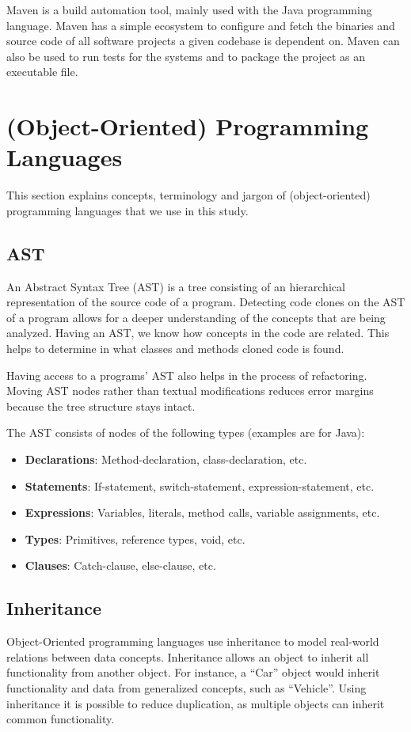 Maven is a build automation tool, mainly used with the Java programming language. Maven has a simple ecosystem to configure and fetch the binaries and source code of all software projects a given codebase is dependent on. Maven can also be used to run tests for the systems and to package the project as an executable file.

\section{(Object-Oriented) Programming Languages}
This section explains concepts, terminology and jargon of (object-oriented) programming languages that we use in this study.

\subsection{AST} \label{sec:astbackground}
An Abstract Syntax Tree (AST) is a tree consisting of an hierarchical representation of the source code of a program. Detecting code clones on the AST of a program allows for a deeper understanding of the concepts that are being analyzed. Having an AST, we know how concepts in the code are related. This helps to determine in what classes and methods cloned code is found.

Having access to a programs' AST also helps in the process of refactoring. Moving AST nodes rather than textual modifications reduces error margins because the tree structure stays intact.

The AST consists of nodes of the following types (examples are for Java):
\begin{itemize}
  \item \textbf{Declarations}: Method-declaration, class-declaration, etc.
  \item \textbf{Statements}: If-statement, switch-statement, expression-statement, etc.
  \item \textbf{Expressions}: Variables, literals, method calls, variable assignments, etc.
  \item \textbf{Types}: Primitives, reference types, void, etc.
  \item \textbf{Clauses}: Catch-clause, else-clause, etc.
\end{itemize}

\subsection{Inheritance}
Object-Oriented programming languages use inheritance to model real-world relations between data concepts. Inheritance allows an object to inherit all functionality from another object. For instance, a ``Car'' object would inherit functionality and data from generalized concepts, such as ``Vehicle''. Using inheritance it is possible to reduce duplication, as multiple objects can inherit common functionality.

